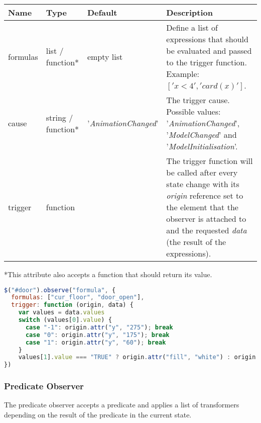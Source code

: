 \begin{tabular}{ l l l p{7cm} }
  \textbf{Name} & \textbf{Type} & \textbf{Default} & \textbf{Description} \\
  \hline\noalign{\medskip}
  formulas & list / function* & empty list & Define a list of expressions that should be evaluated and passed to the trigger function. Example: $['x < 4', 'card(x)']$.\\
  \hline\noalign{\medskip}
  cause & string / function* & '\textit{AnimationChanged}' & The trigger cause. Possible values: '\textit{AnimationChanged}', '\textit{ModelChanged}' and '\textit{ModelInitialisation}'. \\
  \hline\noalign{\medskip}
  trigger & function &  & The trigger function will be called after every state change with its \textit{origin} reference set to the element that the observer is attached to and the requested \textit{data} (the result of the expressions). \\
\end{tabular}

*This attribute also accepts a function that should return its value.

\begin{lstlisting}[float=ht,language=JavaScript]
$("#door").observe("formula", {
  formulas: ["cur_floor", "door_open"],
  trigger: function (origin, data) {
    var values = data.values
    switch (values[0].value) {
      case "-1": origin.attr("y", "275"); break
      case "0": origin.attr("y", "175"); break
      case "1": origin.attr("y", "60"); break
    }
    values[1].value === "TRUE" ? origin.attr("fill", "white") : origin.attr("fill", "lightgray")
})
\end{lstlisting}

\subsubsection{Predicate Observer}

The predicate observer accepts a predicate and applies a list of transformers depending on the result of the predicate in the current state.

